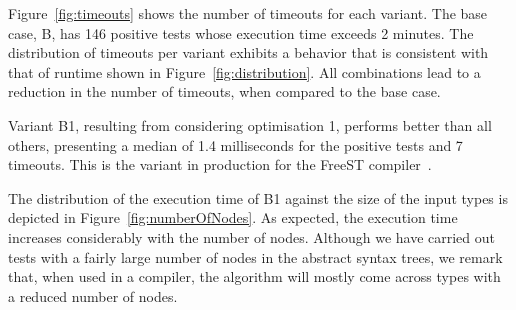 Figure~\ref{fig:timeouts} shows the number of timeouts for each
variant.  The base case, B, has 146 positive tests whose execution
time exceeds 2 minutes. 
The distribution of timeouts per variant exhibits a behavior that is
consistent with that of runtime shown in
Figure~\ref{fig:distribution}.  All combinations lead to a reduction
in the number of timeouts, when  compared to the base case.

Variant B1,
resulting from considering optimisation 1, performs better than all
others, presenting a median of 1.4 milliseconds for the positive tests
and 7 timeouts. This is the variant in production for the FreeST 
compiler~\cite{almeida.etal_freest-functional-language}.

The distribution of the execution time of B1 against the size of the
input types is depicted in Figure~\ref{fig:numberOfNodes}.  As
expected, the execution time increases considerably with the number of
nodes.
%
Although we have carried out tests with a fairly large number of nodes
in the abstract syntax trees, we remark that, when used in a compiler,
the algorithm will mostly come across types with a reduced number of
nodes.

